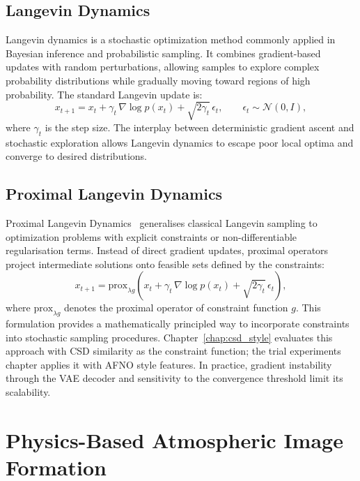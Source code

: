 \subsection{Langevin Dynamics}

Langevin dynamics is a stochastic optimization method commonly applied in Bayesian inference and probabilistic sampling.
It combines gradient-based updates with random perturbations, allowing samples to explore complex probability distributions while gradually moving toward regions of high probability.
The standard Langevin update is:
\begin{equation}
    x_{t+1} = x_t + \gamma_t\,\nabla \log p(x_t) + \sqrt{2\gamma_t}\,\epsilon_t, \qquad \epsilon_t \sim \mathcal{N}(0,I),
\end{equation}
where $\gamma_t$ is the step size.
The interplay between deterministic gradient ascent and stochastic exploration allows Langevin dynamics to escape poor local optima and converge to desired distributions.

\subsection{Proximal Langevin Dynamics}

Proximal Langevin Dynamics~\cite{zampini2025constrained} generalises classical Langevin sampling to optimization problems with explicit constraints or non-differentiable regularisation terms.
Instead of direct gradient updates, proximal operators project intermediate solutions onto feasible sets defined by the constraints:
\begin{equation}
    x_{t+1} = \mathrm{prox}_{\lambda g}\!\left(x_t + \gamma_t\,\nabla \log p(x_t) + \sqrt{2\gamma_t}\,\epsilon_t\right),
\end{equation}
where $\mathrm{prox}_{\lambda g}$ denotes the proximal operator of constraint function $g$.
This formulation provides a mathematically principled way to incorporate constraints into stochastic sampling procedures.
Chapter~\ref{chap:csd_style} evaluates this approach with CSD similarity as the constraint function; the trial experiments chapter applies it with AFNO style features.
In practice, gradient instability through the VAE decoder and sensitivity to the convergence threshold limit its scalability.

\section{Physics-Based Atmospheric Image Formation}
\label{sec:atmospheric_physics}

